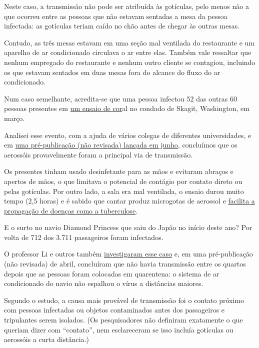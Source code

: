 Neste caso, a transmissão não pode ser atribuída às gotículas, pelo
menos não a que ocorreu entre as pessoas que não estavam sentadas a mesa
da pessoa infectada: as gotículas teriam caído no chão antes de chegar
às outras mesas.

Contudo, as três mesas estavam em uma seção mal ventilada do restaurante
e um aparelho de ar condicionado circulava o ar entre elas. Também vale
ressaltar que nenhum empregado do restaurante e nenhum outro cliente se
contagiou, incluindo os que estavam sentados em duas mesas fora do
alcance do fluxo do ar condicionado.

Num caso semelhante, acredita-se que uma pessoa infectou 52 das outras
60 pessoas presentes em
\href{https://www.nytimes.com/2020/05/12/health/coronavirus-choir.html}{um
ensaio de cor}al no condado de Skagit, Washington, em março.

Analisei esse evento, com a ajuda de vários colegas de diferentes
universidades, e em
\href{https://www.medrxiv.org/content/10.1101/2020.06.15.20132027v2}{uma
pré-publicação (não revisada) lançada em junho}, concluímos que os
aerossóis provavelmente foram a principal via de transmissão.

Os presentes tinham usado desinfetante para as mãos e evitaram abraços e
apertos de mãos, o que limitava o potencial de contágio por contato
direto ou pelas gotículas. Por outro lado, a sala era mal ventilada, o
ensaio durou muito tempo (2,5 horas) e é sabido que cantar produz
microgotas de aerossol e
\href{https://www.atsjournals.org/doi/abs/10.1164/arrd.1968.98.2.297}{facilita
a propagação de doenças como a tuberculose}.

E o surto no navio Diamond Princess que saiu do Japão no início deste
ano? Por volta de 712 dos 3.711 passageiros foram infectados.

O professor Li e outros também
\href{https://www.medrxiv.org/content/10.1101/2020.04.09.20059113v1}{investigaram
esse caso} e, em uma pré-publicação (não revisada) de abril, concluíram
que não havia transmissão entre os quartos depois que as pessoas foram
colocadas em quarentena: o sistema de ar condicionado do navio não
espalhou o vírus a distâncias maiores.

Segundo o estudo, a causa mais provável de transmissão foi o contato
próximo com pessoas infectadas ou objetos contaminados antes dos
passageiros e tripulantes serem isolados. (Os pesquisadores não
definiram exatamente o que queriam dizer com ``contato'', nem
esclareceram se isso incluía gotículas ou aerossóis a curta distância.)

